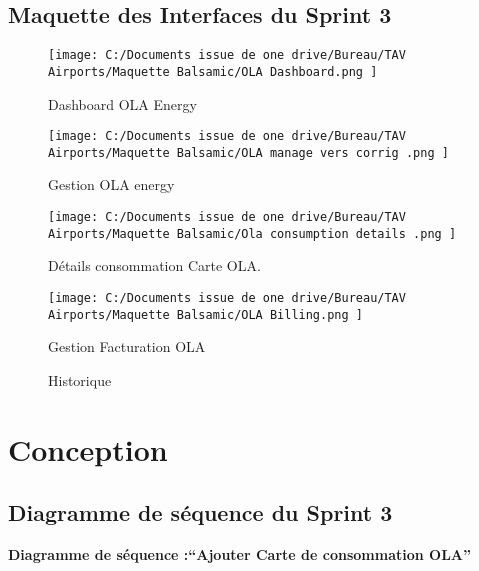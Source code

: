 \documentclass[a4paper,11pt]{report}
\begin{document}
\subsection{Maquette des Interfaces du Sprint 3}



\begin{figure}[H]
  \centering
  \texttt{[image: C:/Documents issue de one drive/Bureau/TAV Airports/Maquette Balsamic/OLA Dashboard.png
]}
  \caption{Dashboard OLA Energy }
  \label{fig:clone-result}
\end{figure}


\begin{figure}[H]
  \centering
  \texttt{[image: C:/Documents issue de one drive/Bureau/TAV Airports/Maquette Balsamic/OLA manage vers corrig .png
]}
  \caption{Gestion OLA energy 
 }
  \label{fig:clone-result}
\end{figure}

\begin{figure}[H]
  \centering
  \texttt{[image: C:/Documents issue de one drive/Bureau/TAV Airports/Maquette Balsamic/Ola consumption details .png
]}
  \caption{ Détails consommation Carte OLA.
 }
  \label{fig:clone-result}
\end{figure}


\begin{figure}[H]
  \centering
  \texttt{[image: C:/Documents issue de one drive/Bureau/TAV Airports/Maquette Balsamic/OLA Billing.png
]}
  \caption{ Gestion Facturation OLA
 }
  \label{fig:clone-result}
\end{figure}
\begin{figure}[H]
  \centering
  \caption{  Historique 
 }
  \label{fig:clone-result}
\end{figure}


\section{Conception}
\subsection{Diagramme de séquence du Sprint 3}

\newpage
\textbf{Diagramme de séquence :“Ajouter Carte de consommation OLA” }
\end{document}
